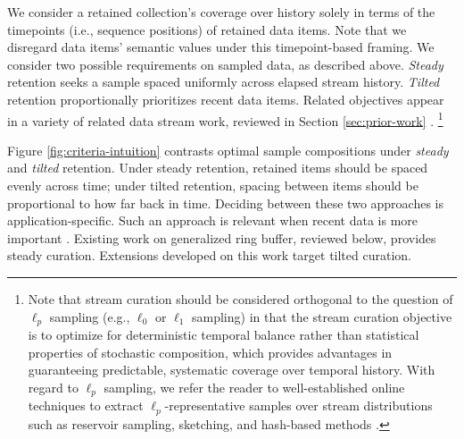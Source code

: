We consider a retained collection's coverage over history solely in terms of the timepoints (i.e., sequence positions) of retained data items.
Note that we disregard data items' semantic values under this timepoint-based framing.
We consider two possible requirements on sampled data, as described above.
\textit{{Steady}} retention seeks a sample spaced uniformly across elapsed stream history.
\textit{{Tilted}} retention proportionally prioritizes recent data items.
Related objectives appear in a variety of related data stream work, reviewed in Section \ref{sec:prior-work} \citep{aggarwal2003framework,han2005stream}.
\footnote{%
Note that stream curation should be considered orthogonal to the question of $\ell_p$ sampling (e.g., $\ell_0$ or $\ell_1$ sampling) in that the stream curation objective is to optimize for deterministic temporal balance rather than statistical properties of stochastic composition, which provides advantages in guaranteeing predictable, systematic coverage over temporal history.
With regard to $\ell_p$ sampling, we refer the reader to well-established online techniques to extract $\ell_p$-representative samples over stream distributions such as reservoir sampling, sketching, and hash-based methods \citep{gaber2005mining,muthukrishnan2005data,cormode2019lp}.
}



Figure \ref{fig:criteria-intuition} contrasts optimal sample compositions under \textit{steady} and \textit{tilted} retention.
Under steady retention, retained items should be spaced evenly across time;
under tilted retention, spacing between items should be proportional to how far back in time.
Deciding between these two approaches is application-specific.
Such an approach is relevant when recent data is more important \citep{phithakkitnukoon2010recent}.
Existing work on generalized ring buffer, reviewed below, provides steady curation.
Extensions developed on this work target tilted curation.

